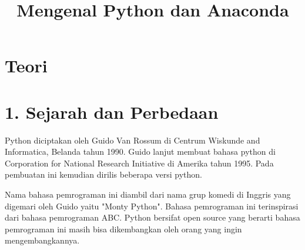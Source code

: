 \clearpage
\setcounter{page}{1}

\begin{center}
\title{\LARGE \bf Mengenal Python dan Anaconda}
\end{center}

\appendix
\section{Teori}

\section*{\normalsize 1. Sejarah dan Perbedaan}

\hspace {\parindent} Python diciptakan oleh Guido Van Rossum di Centrum Wiskunde and Informatica, Belanda tahun 1990. Guido lanjut membuat bahasa python di Corporation for National Research Initiative di Amerika tahun 1995. Pada pembuatan ini kemudian dirilis beberapa versi python.

Nama bahasa pemrograman ini diambil dari nama grup komedi di Inggris yang digemari oleh Guido yaitu "Monty Python". Bahasa pemrograman ini terinspirasi dari bahasa pemrograman ABC. Python bersifat open source yang berarti bahasa pemrograman ini masih bisa dikembangkan oleh orang yang ingin mengembangkannya.

